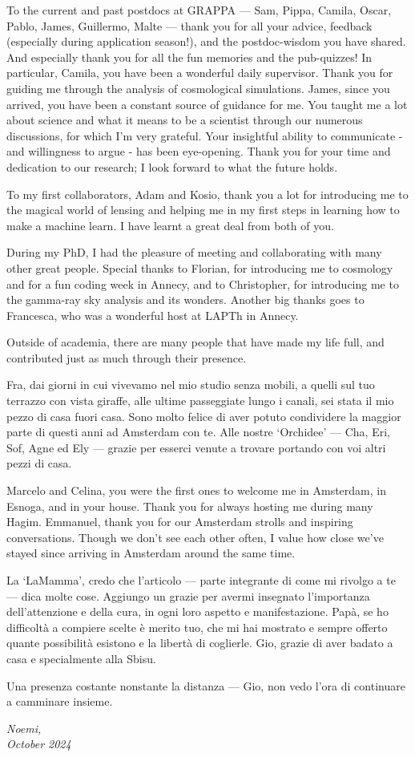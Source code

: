 \clearpage
To the current and past postdocs at GRAPPA --- Sam, Pippa, Camila, Oscar, Pablo, James, Guillermo, Malte --- thank you for all your advice, feedback (especially during application season!), and the postdoc-wisdom you have shared. And especially thank you for all the fun memories and the pub-quizzes! In particular, Camila, you have been a wonderful daily supervisor. Thank you for guiding me through the analysis of cosmological simulations.
James, since you arrived, you have been a constant source of guidance for me. You taught me a lot about science and what it means to be a scientist through our numerous discussions, for which I’m very grateful. Your insightful ability to communicate - and willingness to argue - has been eye-opening. Thank you for your time and dedication to our research; I look forward to what the future holds.

To my first collaborators, Adam and Kosio, thank you a lot for introducing me to the magical world of lensing and helping me in my first steps in learning how to make a machine learn. I have learnt a great deal from both of you.

During my PhD, I had the pleasure of meeting and collaborating with many other great people. Special thanks to Florian, for introducing me to cosmology and for a fun coding week in Annecy, and to Christopher, for introducing me to the gamma-ray sky analysis and its wonders. Another big thanks goes to Francesca, who was a wonderful host at LAPTh in Annecy.

Outside of academia, there are many people that have made my life full, and contributed just as much through their presence.

Fra, dai giorni in cui vivevamo nel mio studio senza mobili, a quelli sul tuo terrazzo con vista giraffe, alle ultime passeggiate lungo i canali, sei stata il mio pezzo di casa fuori casa. Sono molto felice di aver potuto condividere la maggior parte di questi anni ad Amsterdam con te. 
Alle nostre `Orchidee' --- Cha, Eri, Sof, Agne ed Ely --- grazie per esserci venute a trovare portando con voi altri pezzi di casa. 

Marcelo and Celina, you were the first ones to welcome me in Amsterdam, in Esnoga, and in your house. Thank you for always hosting me during many Hagim. 
Emmanuel, thank you for our Amsterdam strolls and inspiring conversations. Though we don’t see each other often, I value how close we’ve stayed since arriving in Amsterdam around the same time.

La `LaMamma', credo che l'articolo --- parte integrante di come mi rivolgo a te --- dica molte cose. Aggiungo un grazie per avermi insegnato l'importanza dell'attenzione e della cura, in ogni loro aspetto e manifestazione. Papà, se ho difficoltà a compiere scelte è merito tuo, che mi hai mostrato e sempre offerto quante possibilità esistono e la libertà di coglierle. Gio, grazie di aver badato a casa e specialmente alla Sbisu. 

\clearpage
Una presenza costante nonstante la distanza --- Gio, non vedo l'ora di continuare a camminare insieme. 

\vskip 2pt

\begin{flushright}
\textit{Noemi, \\
October 2024}
\end{flushright}

